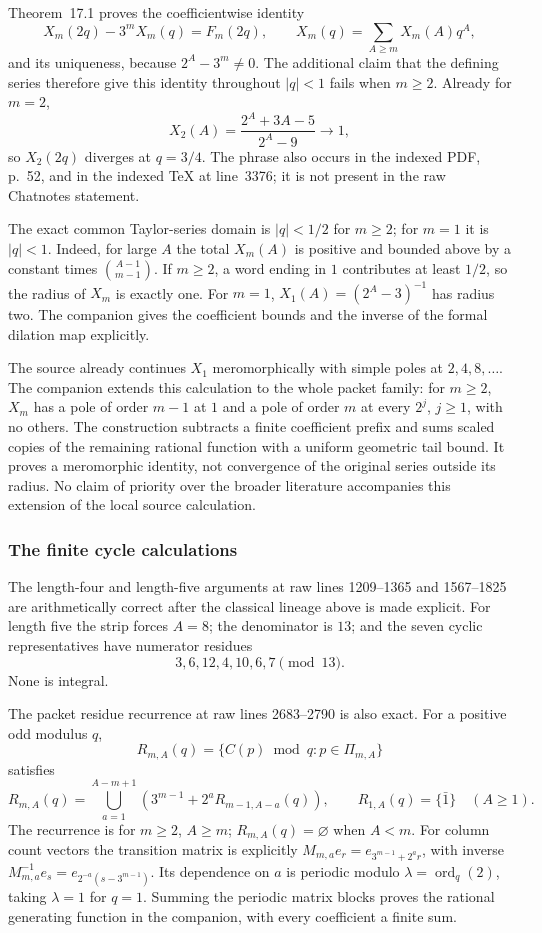 \begin{sourceissue}
\label{issue:affine-mahler-domain}
Theorem~17.1 proves the coefficientwise identity
\[
 X_m(2q)-3^mX_m(q)=F_m(2q),\qquad
 X_m(q)=\sum_{A\ge m}X_m(A)q^A,
\]
and its uniqueness, because $2^A-3^m\ne0$.  The additional claim that
the defining series therefore give this identity throughout $|q|<1$
fails when $m\ge2$.  Already for $m=2$,
\[
 X_2(A)=\frac{2^A+3A-5}{2^A-9}\longrightarrow1,
\]
so $X_2(2q)$ diverges at $q=3/4$.  The phrase also occurs in the
indexed PDF, p.~52, and in the indexed TeX at line~3376; it is not
present in the raw Chatnotes statement.

The exact common Taylor-series domain is $|q|<1/2$ for $m\ge2$;
for $m=1$ it is $|q|<1$.  Indeed, for large $A$ the total $X_m(A)$
is positive and bounded above by a constant times
$\binom{A-1}{m-1}$.  If $m\ge2$, a word ending in $1$ contributes
at least $1/2$, so the radius of $X_m$ is exactly one.  For $m=1$,
$X_1(A)=(2^A-3)^{-1}$ has radius two.  The companion gives the
coefficient bounds and the inverse of the formal dilation map explicitly.
\end{sourceissue}

The source already continues $X_1$ meromorphically with simple poles at
$2,4,8,\ldots$.  The companion extends this calculation to the whole
packet family: for $m\ge2$, $X_m$ has a pole of order $m-1$ at $1$
and a pole of order $m$ at every $2^j$, $j\ge1$, with no others.
The construction subtracts a finite coefficient prefix and sums scaled
copies of the remaining rational function with a uniform geometric tail
bound.  It proves a meromorphic identity, not convergence of the original
series outside its radius.  No claim of priority over the broader
literature accompanies this extension of the local source calculation.

\subsubsection{The finite cycle calculations}

The length-four and length-five arguments at raw lines 1209--1365 and
1567--1825 are arithmetically correct after the classical lineage above is
made explicit.  For length five the strip forces $A=8$; the denominator is
$13$; and the seven cyclic representatives have numerator residues
\[
 3,6,12,4,10,6,7\pmod{13}.
\]
None is integral.

The packet residue recurrence at raw lines 2683--2790 is also exact.  For a
positive odd modulus $q$,
\[
 R_{m,A}(q)=\{C(p)\bmod q:p\in\Pi_{m,A}\}
\]
satisfies
\[
 R_{m,A}(q)=
 \bigcup_{a=1}^{A-m+1}
 \left(3^{m-1}+2^aR_{m-1,A-a}(q)\right),
 \qquad R_{1,A}(q)=\{\bar1\}\quad(A\ge1).
\]
The recurrence is for $m\ge2$, $A\ge m$; $R_{m,A}(q)=\varnothing$
when $A<m$.  For column count vectors the transition matrix is explicitly
$M_{m,a}e_r=e_{3^{m-1}+2^ar}$, with inverse
$M_{m,a}^{-1}e_s=e_{2^{-a}(s-3^{m-1})}$.  Its dependence on $a$ is
periodic modulo $\lambda=\operatorname{ord}_q(2)$, taking $\lambda=1$
for $q=1$.  Summing the periodic matrix blocks proves the rational generating
function in the companion, with every coefficient a finite sum.

